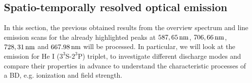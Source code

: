 \documentclass[a4paper,10pt,twoside]{article}
\begin{document}
		
		
		
		
		
		\subsection{Spatio-temporally resolved optical emission}\label{subsec:stroe}
		
			In this section, the previous obtained results from the overview spectrum and line emission scans for the already highlighted peaks at $\unit[587,65]{nm}$, $\unit[706,66]{nm}$, $\unit[728,31]{nm}$ and $\unit[667.98]{nm}$ will be processed. In particular, we will look at the emission for He I ($3^3$S-$2^3$P) triplet, to investigate different discharge modes and compare their properties in advance to understand the characteristic processes of a BD, e.g. ionization and field strength.
\end{document}
